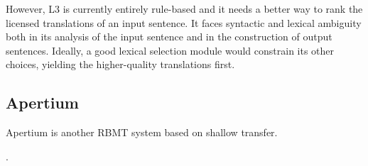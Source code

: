 However, L3 is currently entirely rule-based and it needs a better way to rank
the licensed translations of an input sentence. It faces syntactic and lexical
ambiguity both in its analysis of the input sentence and in the construction of
output sentences. Ideally, a good lexical selection module would constrain its
other choices, yielding the higher-quality translations first.

\subsection{Apertium}
Apertium is another RBMT system based on shallow transfer.

\cite{Forcada_theapertium}.
